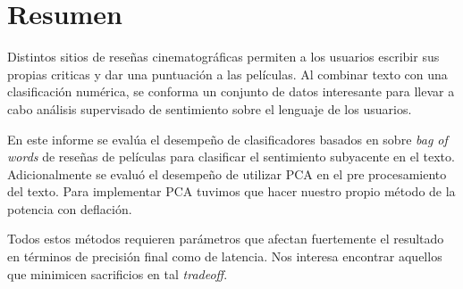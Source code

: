 \section{Resumen}%
\label{sec:abstracto}

Distintos sitios de reseñas cinematográficas permiten a los usuarios escribir
sus propias criticas y dar una puntuación a las películas.
Al combinar texto con una clasificación numérica, se conforma un conjunto de
datos interesante para llevar a cabo análisis supervisado de sentimiento sobre
el lenguaje de los usuarios.

En este informe se evalúa el desempeño de clasificadores basados en \knn{}
sobre \textit{bag of words} de reseñas de películas para clasificar el
sentimiento subyacente en el texto.
Adicionalmente se evaluó el desempeño de utilizar PCA en el pre
procesamiento del texto.
Para implementar PCA tuvimos que hacer nuestro propio método de la potencia con deflación.


Todos estos métodos requieren parámetros que afectan fuertemente el resultado en
términos de precisión final como de latencia. Nos interesa encontrar aquellos
que minimicen sacrificios en tal \textit{tradeoff}.
